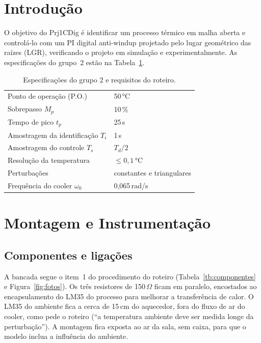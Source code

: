 \documentclass[a4paper]{ifacconf}
\begin{document}
\section{Introdução}

O objetivo do Prj1CDig \citep{Bauchspiess:Prj1CDig} é identificar um processo térmico em malha
aberta e controlá-lo com um PI digital anti-windup projetado pelo lugar geométrico das raízes
(LGR), verificando o projeto em simulação e experimentalmente. As especificações do grupo~2 estão
na Tabela~\ref{tb:espec}.

\begin{table}[hb]
\begin{center}
\caption{Especificações do grupo 2 e requisitos do roteiro.}\label{tb:espec}
\begin{tabular}{ll}\toprule
Ponto de operação (P.O.) & 50\,°C \\
Sobrepasso $M_p$ & 10\,\% \\
Tempo de pico $t_p$ & 25\,s \\
Amostragem da identificação $T_i$ & 1\,s \\
Amostragem do controle $T_s$ & $T_d/2$ \\
Resolução da temperatura & $\le 0{,}1$\,°C \\
Perturbações & constantes e triangulares \\
Frequência do cooler $\omega_0$ & 0,065\,rad/s \\ \bottomrule
\end{tabular}
\end{center}
\end{table}

\section{Montagem e Instrumentação}\label{sec:montagem}

\subsection{Componentes e ligações}

A bancada segue o item~1 do procedimento do roteiro (Tabela~\ref{tb:componentes} e
Figura~\ref{fig:fotos}). Os três resistores de 150\,$\Omega$ ficam em paralelo, encostados ao
encapsulamento do LM35 do processo para melhorar a transferência de calor. O LM35 do ambiente
fica a cerca de 15\,cm do aquecedor, fora do fluxo de ar do cooler, como pede o roteiro
(``a temperatura ambiente deve ser medida longe da perturbação''). A montagem fica exposta ao
ar da sala, sem caixa, para que o modelo inclua a influência do ambiente.
\end{document}
